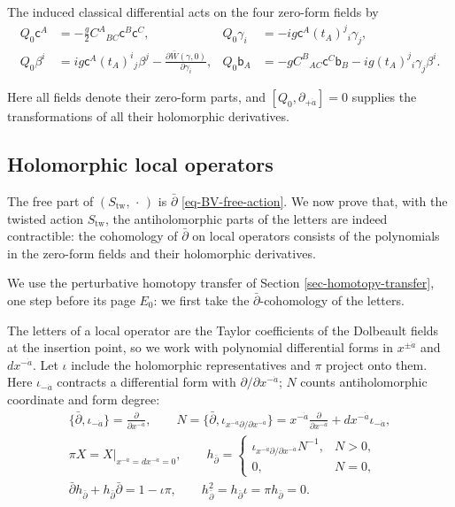 \documentclass[11pt]{article}
\numberwithin{equation}{section}
\numberwithin{figure}{section}
\numberwithin{table}{section}
\begin{document}
The induced classical differential acts on the four zero-form fields by
\begin{equation}\label{eq-B-15}
\begin{aligned}
Q_0\mathsf c^A&=-\frac g2 C^A{}_{BC}\mathsf c^B\mathsf c^C,
&Q_0\gamma_i&=-ig\mathsf c^A(t_A)^j{}_i\gamma_j,\\
Q_0\beta^i&=ig\mathsf c^A(t_A)^i{}_j\beta^j
-\frac{\partial\bar W(\gamma,0)}{\partial\gamma_i},
&Q_0\mathsf b_A&=-gC^B{}_{AC}\mathsf c^C\mathsf b_B
-ig(t_A)^j{}_i\gamma_j\beta^i.
\end{aligned}
\end{equation}

Here all fields denote their zero-form parts, and $[Q_0,\partial_{+\dot a}]=0$ supplies the transformations of all their holomorphic derivatives.

\subsection{Holomorphic local operators}\label{dolbeault-contraction-and-wick-derivatives}

The free part of $(S_{\mathrm{tw}},\,\cdot\,)$ is $\bar\partial$ \eqref{eq-BV-free-action}. We now prove that, with the twisted action $S_{\mathrm{tw}}$, the antiholomorphic parts of the letters are indeed contractible: the cohomology of $\bar\partial$ on local operators consists of the polynomials in the zero-form fields and their holomorphic derivatives.

We use the perturbative homotopy transfer of Section \ref{sec-homotopy-transfer}, one step before its page $E_0$: we first take the $\bar\partial$-cohomology of the letters.

The letters of a local operator are the Taylor coefficients of the Dolbeault fields at the insertion point, so we work with polynomial differential forms in $x^{\pm\dot a}$ and $dx^{-\dot a}$. Let $\iota$ include the holomorphic representatives and $\pi$ project onto them.~ Here $\iota_{-\dot a}$ contracts a differential form with $\partial/\partial x^{-\dot a}$; $N$ counts antiholomorphic coordinate and form degree:
\begin{equation}\label{eq-B-20}
\begin{gathered}
\{\bar\partial,\iota_{-\dot a}\}=\frac{\partial}{\partial x^{-\dot a}},
\qquad
N=\{\bar\partial,\iota_{x^{-\dot a}\partial/\partial x^{-\dot a}}\}
=x^{-\dot a}\frac{\partial}{\partial x^{-\dot a}}
+dx^{-\dot a}\iota_{-\dot a},\\
\pi X=X\big|_{x^{-\dot a}=dx^{-\dot a}=0},
\qquad
h_{\bar\partial}=\begin{cases}
\iota_{x^{-\dot a}\partial/\partial x^{-\dot a}}N^{-1},&N>0,\\
0,&N=0,
\end{cases}\\
\bar\partial h_{\bar\partial}+h_{\bar\partial}\bar\partial=1-\iota\pi,
\qquad h_{\bar\partial}^2=h_{\bar\partial}\iota=\pi h_{\bar\partial}=0.
\end{gathered}
\end{equation}
\end{document}
